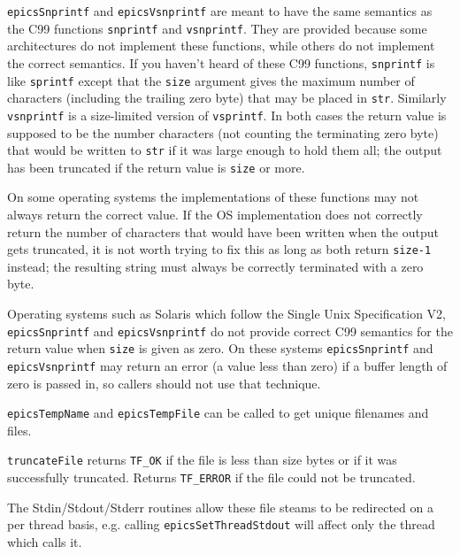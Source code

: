 \verb|epicsSnprintf| and \verb|epicsVsnprintf| are meant to have the same semantics as the C99 functions \verb|snprintf| and 
\verb|vsnprintf|. They are provided because some architectures do not implement these functions, while others do not 
implement the correct semantics. If you haven't heard of these C99 functions, \verb|snprintf| is like \verb|sprintf| except that 
the \verb|size| argument gives the maximum number of characters (including the trailing zero byte) that may be placed in \verb|str|. 
Similarly \verb|vsnprintf| is a size-limited version of \verb|vsprintf|. In both cases the return value is supposed to be the 
number characters (not counting the terminating zero byte) that would be written to \verb|str| if it was large enough to hold 
them all; the output has been truncated if the return value is \verb|size| or more.

On some operating systems the implementations of these functions may not always return the correct value. If the OS 
implementation does not correctly return the number of characters that would have been written when the output gets 
truncated, it is not worth trying to fix this as long as both return \verb|size-1| instead; the resulting string must always be 
correctly terminated with a zero byte.

Operating systems such as Solaris which follow the Single Unix Specification V2, \\ \verb|epicsSnprintf| and 
\verb|epicsVsnprintf| do not provide correct C99 semantics for the return value when \verb|size| is given as zero.  On these 
systems \verb|epicsSnprintf| and \verb|epicsVsnprintf| may return an error (a value less than zero) if a buffer length of 
zero is passed in, so callers should not use that technique.

\verb|epicsTempName| and \verb|epicsTempFile| can be called to get unique filenames and files.

\verb|truncateFile| returns \verb|TF_OK| if the file is less than size bytes or if it was successfully truncated. Returns \verb|TF_ERROR| 
if the file could not be truncated. 

The Stdin/Stdout/Stderr routines allow these file steams to be redirected on a per thread basis, e.g. calling 
\verb|epicsSetThreadStdout| will affect only the thread which calls it.


